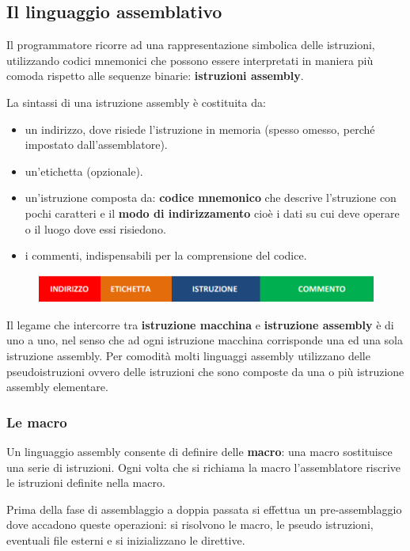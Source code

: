 \documentclass[12pt]{article}
\begin{document}
\subsection{Il linguaggio assemblativo}
Il programmatore ricorre ad una rappresentazione simbolica delle istruzioni, utilizzando codici mnemonici che possono essere interpretati in maniera più comoda rispetto alle sequenze binarie: \textbf{istruzioni assembly}.
\par\maketitle\noindent
La sintassi di una istruzione assembly è costituita da:
\begin{itemize}
    \item un indirizzo, dove risiede l’istruzione in memoria (spesso omesso, perché impostato dall’assemblatore).
    \item un'etichetta (opzionale).
    \item un'istruzione composta da: \textbf{codice mnemonico} che descrive l'struzione con pochi caratteri e il \textbf{modo di indirizzamento} cioè i dati su cui deve operare o il luogo dove essi risiedono.
    \item i commenti, indispensabili per la comprensione del codice.
\end{itemize}
\begin{figure}[h]
    \centering
    \includegraphics[width=0.75\linewidth]{istruszione.png}
    \label{fig:enter-label}
\end{figure}
\par\maketitle\noindent 
Il legame che intercorre tra \textbf{istruzione macchina} e \textbf{istruzione assembly} è di uno a uno, nel senso che ad ogni istruzione macchina corrisponde una ed una sola istruzione assembly. Per comodità molti linguaggi assembly utilizzano delle pseudoistruzioni ovvero delle istruzioni che sono composte da una o più istruzione assembly elementare.
\subsubsection{Le macro}
Un linguaggio assembly consente di definire delle \textbf{macro}: una macro sostituisce una serie di istruzioni. Ogni volta che si richiama la macro l’assemblatore riscrive le istruzioni definite nella macro.\par\medskip\noindent
Prima della fase di assemblaggio a doppia passata si effettua un pre-assemblaggio dove accadono queste operazioni: si risolvono le macro, le pseudo istruzioni, eventuali file esterni e si inizializzano le direttive.
\end{document}
